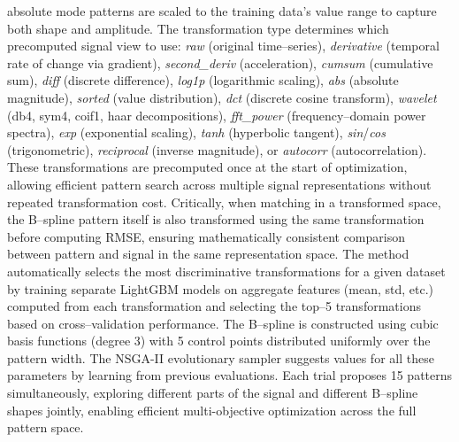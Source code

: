 \documentclass[11pt]{article}
\begin{document}
absolute mode patterns are scaled to the training data's value range to capture
both shape and amplitude.
The transformation type determines which precomputed signal view to use:
\textit{raw} (original time--series), \textit{derivative} (temporal rate of change via gradient),
\textit{second\_deriv} (acceleration), \textit{cumsum} (cumulative sum), \textit{diff} (discrete difference),
\textit{log1p} (logarithmic scaling), \textit{abs} (absolute magnitude),
\textit{sorted} (value distribution), \textit{dct} (discrete cosine transform),
\textit{wavelet} (db4, sym4, coif1, haar decompositions), \textit{fft\_power} (frequency--domain power spectra),
\textit{exp} (exponential scaling), \textit{tanh} (hyperbolic tangent), \textit{sin}/\textit{cos} (trigonometric),
\textit{reciprocal} (inverse magnitude), or \textit{autocorr} (autocorrelation).
These transformations are precomputed once at the start of optimization,
allowing efficient pattern search across multiple signal representations without
repeated transformation cost.
Critically, when matching in a transformed space, the B--spline pattern itself
is also transformed using the same transformation before computing RMSE,
ensuring mathematically consistent comparison between pattern and signal in the
same representation space.
The method automatically selects the most discriminative transformations for a given
dataset by training separate LightGBM models on aggregate features (mean, std, etc.)
computed from each transformation and selecting the top--5 transformations based on
cross--validation performance.
The B--spline is constructed using cubic basis functions (degree 3) with
5 control points distributed uniformly over the pattern width.
The NSGA-II evolutionary sampler suggests values for all these parameters by
learning from previous evaluations.
Each trial proposes 15 patterns simultaneously, exploring different parts of
the signal and different B--spline shapes jointly, enabling efficient
multi-objective optimization across the full pattern space.
\end{document}
